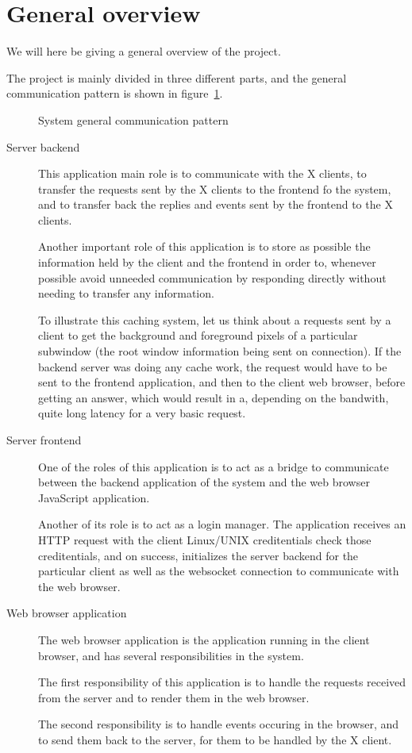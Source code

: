 \section{General overview}
We will here be giving a general overview of the project. 

The project is mainly divided in three different parts, and the general 
communication pattern is shown in figure~\ref{fig:project-overview}.
\begin{figure}[tb]
  \begin{center}
    
    \caption{\label{fig:project-overview}System general communication pattern}
  \end{center}
\end{figure}
\begin{description}
\item[Server backend]
  This application main role is to communicate with the X clients, 
  to transfer the requests sent by the X clients to the frontend fo the system, 
  and to transfer back the replies and events sent by the frontend to the 
  X clients. 
  
  Another important role of this application is to store as possible 
  the information held by the client and the frontend in order to, whenever 
  possible avoid unneeded communication by responding directly without 
  needing to transfer any information.

  To illustrate this caching system, let us think about a requests sent by a 
  client to get the background and foreground pixels of a particular 
  subwindow (the root window information being sent on connection). If the 
  backend server was doing any cache work, the request would have to be 
  sent to the frontend application, and then to the client web browser, before 
  getting an answer, which would result in a, depending on the bandwith, 
  quite long latency for a very basic request.   
  
\item[Server frontend]
  One of the roles of this application  is to act as a bridge to
  communicate between the backend application of the system 
  and the web browser JavaScript application.

  Another of its role is to act as a login manager. The application 
  receives an HTTP request with the client Linux/UNIX creditentials 
  check those creditentials, and on success, initializes the server 
  backend for the particular client as well as the websocket connection 
  to communicate with the web browser.
\item[Web browser application]
  The web browser application is the application running in the client 
  browser, and has several responsibilities in the system.

  The first responsibility of this application is to handle the 
  requests received from the server and to render them in the web 
  browser.

  The second responsibility is to handle events occuring in the browser, and to 
  send them back to the server, for them to be handled by the X client.
\end{description}



